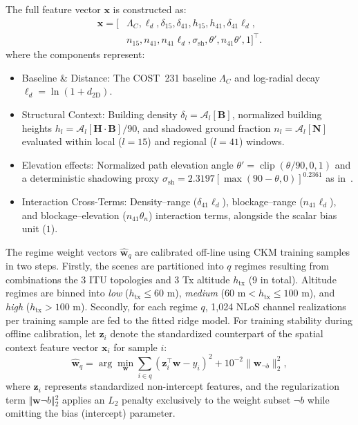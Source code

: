 \documentclass[10pt,conference,letterpaper]{IEEEtran}
\begin{document}
The full feature vector $\mathbf{x}$ is constructed as:
\begin{equation}
\begin{aligned}
\mathbf x=[&\Lambda_{C},\ell_d,\delta_{15},\delta_{41},h_{15},h_{41},
\delta_{41}\ell_d,\\
&n_{15},n_{41},n_{41}\ell_d,\sigma_{\mathrm{sh}},\theta',
n_{41}\theta',1]^{\top}.
\end{aligned}
\label{eq:nlos-vector}
\end{equation}
where the components represent:
\begin{itemize}
    \item Baseline \& Distance: The COST~231 baseline $\Lambda_C$ and log-radial decay $\ell_d = \ln(1 + d_{\text{2D}})$.
    \item Structural Context: Building density $\delta_l = \mathcal{A}_l[\mathbf{B}]$, normalized building heights $h_l = \mathcal{A}_l[\mathbf{H} \cdot \mathbf{B}] / 90$, and shadowed ground fraction $n_l = \mathcal{A}_l[\mathbf{N}]$ evaluated within local ($l=15$) and regional ($l=41$) windows.
    \item Elevation effects: Normalized path elevation angle $\theta' = \operatorname{clip}(\theta / 90, 0, 1)$ and a deterministic shadowing proxy $\sigma_{\text{sh}} = 2.3197 \left[\max(90 - \theta, 0)\right]^{0.2361}$ as in~\cite{feng2006a2g}.
    \item Interaction Cross-Terms: Density--range ($\delta_{41}\ell_d$), blockage--range ($n_{41}\ell_d$), and blockage--elevation ($n_{41}\theta_n$) interaction terms, alongside the scalar bias unit ($1$).
\end{itemize}

The regime weight vectors $\hat{\mathbf{w}}_q$ are calibrated off-line using CKM training samples in two steps. Firstly, the scenes are partitioned into $q$ regimes resulting from combinations the 3 ITU topologies and 3 Tx altitude $h_{\text{tx}}$ (9 in total). Altitude regimes are binned into \textit{low} ($h_{\text{tx}} \le 60\text{~m}$), \textit{medium} ($60\text{~m} < h_{\text{tx}} \le 100\text{~m}$), and \textit{high} ($h_{\text{tx}} > 100\text{~m}$). Secondly, for each regime $q$, 1,024 NLoS channel realizations per training sample are fed to the fitted ridge model. For training stability during offline calibration, let $\mathbf{z}_i$ denote the standardized counterpart of the spatial context feature vector $\mathbf{x}_i$ for sample $i$:
    \begin{equation}
    \hat{\mathbf{w}}_q = \arg\min_{\mathbf{w}} \sum_{i \in q} \left( \mathbf{z}_i^\top \mathbf{w} - y_i \right)^2 + 10^{-2} \|\mathbf{w}_{\neg b}\|_2^2,
    \label{eq:nlos-ridge}
    \end{equation}
    where $\mathbf{z}_i$ represents standardized non-intercept features, and the regularization term $\Vert{}\mathbf{w}{\neg b}\Vert{}_2^2$ applies an $L_2$ penalty exclusively to the weight subset $\neg b$ while omitting the bias (intercept) parameter. 
\end{document}
